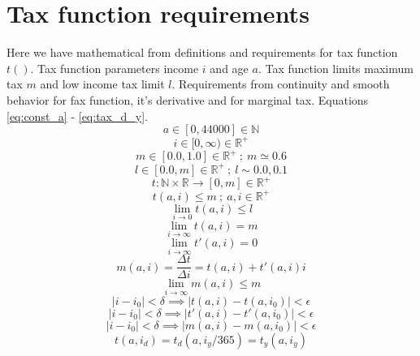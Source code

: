 \section{Tax function requirements}
\label{tax_function_requirements}
Here we have mathematical from definitions and requirements for tax function $t()$.
Tax function parameters income $i$ and age $a$.
Tax function limits maximum tax $m$ and low income tax limit $l$.
Requirements from continuity and smooth behavior for fax function,
it's derivative and for marginal tax. Equations 
\ref{eq:const_a} - \ref{eq:tax_d_y}.
\begin{equation} \label{eq:const_a}
 a \in [0,44000]\in \mathbb{N}
\end{equation}
\begin{equation} \label{eq:const_i}
 i \in [0,\infty)\in \mathbb{R}^+
\end{equation}
\begin{equation} \label{eq:const_m}
 m \in [0.0,1.0] \in \mathbb{R}^+ ~;~ m \simeq 0.6
\end{equation}
\begin{equation} \label{eq:const_l}
 l \in [0.0,m] \in \mathbb{R}^+ ~;~ l \sim 0.0,0.1
\end{equation}
\begin{equation} \label{eq:def_t}
 t:\mathbb{N}\times\mathbb{R} \rightarrow [0,m]\in\mathbb{R}^+
\end{equation}
\begin{equation} \label{eq:tax_t}
 t(a,i)\leq m ~;~ a,i \in \mathbb{R}^+
\end{equation}
\begin{equation} \label{eq:ltax_min}
 \lim_{i \to 0} t(a,i)\leq l
\end{equation}
\begin{equation} \label{eq:ltax_max}
 \lim_{i \to \infty} t(a,i) = m
\end{equation}
\begin{equation} \label{eq:dtax_min}
 \lim_{i \to \infty} t'(a,i)=0
\end{equation}
\begin{equation} \label{eq:tax_mrg}
 m(a,i) = \frac {\Delta t} {\Delta i} = t(a,i)+t'(a,i) i
\end{equation}
\begin{equation} \label{eq:tax_mmax}
 \lim_{i \to \infty} m(a,i)\leq m
\end{equation}
\begin{equation} \label{eq:tax_smooth}
 |i-i_0|<\delta \implies |t(a,i)-t(a,i_0)|<\epsilon
\end{equation}
\begin{equation} \label{eq:dtax_smooth}
 |i-i_0|<\delta \implies |t'(a,i)-t'(a,i_0)|<\epsilon
\end{equation}
\begin{equation} \label{eq:mtax_smooth}
|i-i_0|<\delta \implies |m(a,i)-m(a,i_0)|<\epsilon
\end{equation}
\begin{equation} \label{eq:tax_d_y}
 t(a,i_d)=t_d(a,i_y/365)=t_y(a,i_y)
\end{equation}
